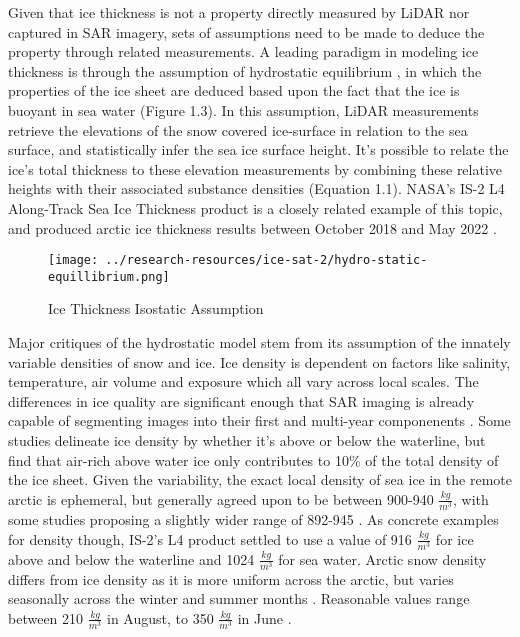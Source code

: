  \indent Given that ice thickness is not a property directly measured by LiDAR nor captured in SAR imagery, sets of assumptions need to be made to deduce the property through related measurements. A leading paradigm in modeling ice thickness is through the assumption of hydrostatic equilibrium \cite{ICESat-2-L4-Product, Hutchings_Heil_Lecomte_Stevens_Steer_Lieser_2015, Forsström_Gerland_Pedersen_2011}, in which the properties of the ice sheet are deduced based upon the fact that the ice is buoyant in sea water (Figure 1.3). In this assumption, LiDAR measurements retrieve the elevations of the snow covered ice-surface in relation to the sea surface, and statistically infer the sea ice surface height. It's possible to relate the ice's total thickness to these elevation measurements by combining these relative heights with their associated substance densities (Equation 1.1). NASA's IS-2 L4 Along-Track Sea Ice Thickness product is a closely related example of this topic, and produced arctic ice thickness results between October 2018 and May 2022 \cite{ICESat-2-L4-Product}.
 \begin{figure}[]
	\centering
	\texttt{[image: ../research-resources/ice-sat-2/hydro-static-equillibrium.png]}
	\caption{Ice Thickness Isostatic Assumption} \cite{ICESat-2-L4-Product}
	\label{fig:hydro-static-diagram}
\end{figure}

Major critiques of the hydrostatic model stem from its assumption of the innately variable densities of snow and ice. Ice density is dependent on factors like salinity, temperature, air volume and exposure \cite{sea-ice-properties} which all vary across local scales. The differences in ice quality are significant enough that SAR imaging is already capable of segmenting images into their first and multi-year componenents \cite{SAR-U-Net}. Some studies delineate ice density by whether it's above or below the waterline, but find that air-rich above water ice only contributes to 10\% of the total density of the ice sheet. Given the variability, the exact local density of sea ice in the remote arctic is ephemeral, but generally agreed upon to be between 900-940 $\frac{kg}{m^3}$, with some studies proposing a slightly wider range of 892-945 \cite{sea-ice-properties}. As concrete examples for density though, IS-2's L4 product settled to use a value of 916 $\frac{kg}{m^3}$ for ice above and below the waterline and 1024 $\frac{kg}{m^3}$ for sea water. Arctic snow density differs from ice density as it is more uniform across the arctic, but varies seasonally across the winter and summer months \cite{warren1999snow}. Reasonable values range between 210 $\frac{kg}{m^3}$ in August, to 350 $\frac{kg}{m^3}$ in June \cite{warren1999snow}.

